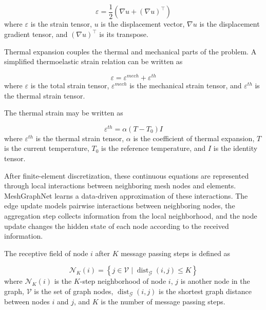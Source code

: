 \begin{equation}
\varepsilon
=
\frac{1}{2}
\left(
\nabla u
+
(\nabla u)^{\top}
\right)
\end{equation}
where \(\varepsilon\) is the strain tensor, \(u\) is the displacement vector, \(\nabla u\) is the displacement gradient tensor, and \((\nabla u)^{\top}\) is its transpose.

Thermal expansion couples the thermal and mechanical parts of the problem. A simplified thermoelastic strain relation can be written as

\begin{equation}
\varepsilon
=
\varepsilon^{mech}
+
\varepsilon^{th}
\end{equation}
where \(\varepsilon\) is the total strain tensor, \(\varepsilon^{mech}\) is the mechanical strain tensor, and \(\varepsilon^{th}\) is the thermal strain tensor.

The thermal strain may be written as

\begin{equation}
\varepsilon^{th}
=
\alpha
\left(
T - T_0
\right)
I
\end{equation}
where \(\varepsilon^{th}\) is the thermal strain tensor, \(\alpha\) is the coefficient of thermal expansion, \(T\) is the current temperature, \(T_0\) is the reference temperature, and \(I\) is the identity tensor.

After finite-element discretization, these continuous equations are represented through local interactions between neighboring mesh nodes and elements. MeshGraphNet learns a data-driven approximation of these interactions. The edge update models pairwise interactions between neighboring nodes, the aggregation step collects information from the local neighborhood, and the node update changes the hidden state of each node according to the received information.

The receptive field of node \(i\) after \(K\) message passing steps is defined as

\begin{equation}
\mathcal{N}_K(i)
=
\left\{
j \in \mathcal{V}
\mid
\operatorname{dist}_{\mathcal{G}}(i,j) \leq K
\right\}
\end{equation}
where \(\mathcal{N}_K(i)\) is the \(K\)-step neighborhood of node \(i\), \(j\) is another node in the graph, \(\mathcal{V}\) is the set of graph nodes, \(\operatorname{dist}_{\mathcal{G}}(i,j)\) is the shortest graph distance between nodes \(i\) and \(j\), and \(K\) is the number of message passing steps.

